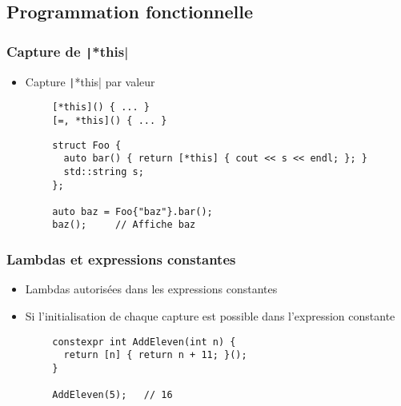 \documentclass[C++.tex]{subfiles}
\begin{document}
\subsection*{Programmation fonctionnelle}
\begin{frame}[fragile]
	\frametitle{Capture de \texttt|*this|}
	\begin{itemize}
		\item Capture \texttt|*this| par valeur

	\end{itemize}

	\begin{verbatim}
		[*this]() { ... }
		[=, *this]() { ... }
	\end{verbatim}

	\begin{verbatim}
		struct Foo {
		  auto bar() { return [*this] { cout << s << endl; }; }
		  std::string s;
		};

		auto baz = Foo{"baz"}.bar();
		baz();     // Affiche baz
	\end{verbatim}

\end{frame}

\begin{frame}[fragile]
	\frametitle{Lambdas et expressions constantes}
	\begin{itemize}
		\item Lambdas autorisées dans les expressions constantes
		\item Si l'initialisation de chaque capture est possible dans l'expression constante
	\end{itemize}

	\begin{verbatim}
		constexpr int AddEleven(int n) {
		  return [n] { return n + 11; }();
		}

		AddEleven(5);   // 16
	\end{verbatim}

\end{frame}
\end{document}
